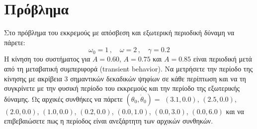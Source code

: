 \documentclass[a4paper,titlepage,12pt]{article}
\begin{document}
\section{Πρόβλημα}

Στο πρόβλημα του εκκρεμούς με απόσβεση και εξωτερική περιοδική δύναμη
να πάρετε:
$$
\omega_0 = 1\, , \quad
\omega   = 2\, , \quad
\gamma   = 0.2
$$ 
Η κίνηση του συστήματος για $A=0.60$, $A=0.75$ και $A=0.85$ είναι
περιοδική μετά από τη μεταβατική συμπεριφορά (transient behavior). Να
μετρήσετε την περίοδο της κίνησης με ακρίβεια 3 σημαντικών δεκαδικών
ψηφίων σε κάθε περίπτωση και να τη συγκρίνετε με την φυσική περίοδο
του εκκρεμούς και την περίοδο της εξωτερικής δύναμης. Ως αρχικές
συνθήκες να πάρετε $(\theta_0,\dot\theta_0)= $ $(3.1,0.0)$,
$(2.5,0.0)$, $(2.0,0.0)$, $(1.0,0.0)$, $(0.2,0.0)$, $(0.0,1.0)$,
$(0.0,3.0)$, $(0.0,6.0)$ και να επιβεβαιώσετε πως η περίοδος είναι
ανεξάρτητη των αρχικών συνθηκών.
 
\end{document}
